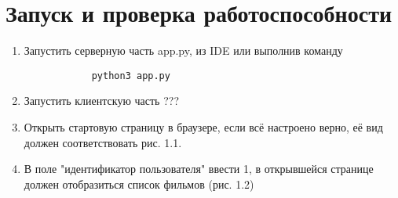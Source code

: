 \documentclass[a4paper,12pt]{report} %
\begin{document}
    \section{Запуск и проверка работоспособности}
    \begin{enumerate}
    	\item Запустить серверную часть app.py, из IDE или выполнив команду 
    	\begin{verbatim}
    		python3 app.py
    	\end{verbatim} 
        \item Запустить клиентскую часть ???
        \item Открыть стартовую страницу в браузере, если всё настроено верно, её вид должен соответствовать рис. 1.1.
        \item В поле "идентификатор пользователя" ввести 1, в открывшейся странице должен отобразиться список фильмов (рис. 1.2)
        
    \end{enumerate}
	
\end{document}
